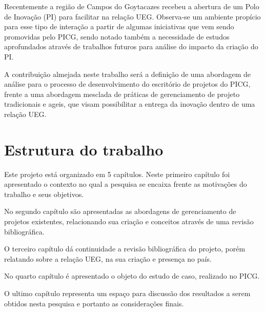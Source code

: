 Recentemente a região de Campos do Goytacazes recebeu a abertura de um Polo de Inovação (PI) para facilitar na relação UEG. Observa-se um ambiente propício para esse tipo de interação a partir de algumas iniciativas que vem sendo promovidas pelo PICG, sendo notado também a necessidade de estudos aprofundados através de trabalhos futuros para análise do impacto da criação do PI.

A contribuição almejada neste trabalho será a definição de uma abordagem de análise para o processo de desenvolvimento do escritório de projetos do PICG, frente a uma abordagem mesclada de práticas de gerenciamento de projeto tradicionais e ageis, que visam possibilitar a entrega da inovação dentro de uma relação UEG.


\section{Estrutura do trabalho}

Este projeto está organizado em 5 capítulos. Neste primeiro capítulo foi apresentado o contexto no qual a pesquisa se encaixa frente as motivações do trabalho e seus objetivos.

No segundo capítulo são apresentadas as abordagens de gerenciamento de projetos existentes, relacionando sua criação e conceitos através de uma revisão bibliográfica.

O terceiro capítulo dá continuidade a revisão bibliográfica do projeto, porém relatando sobre a relação UEG, na sua criação e presença no país.

No quarto capítulo é apresentado o objeto do estudo de caso, realizado no PICG.

O ultimo capítulo representa um espaço para discussão dos resultados a serem obtidos nesta pesquisa e portanto as considerações finais.

